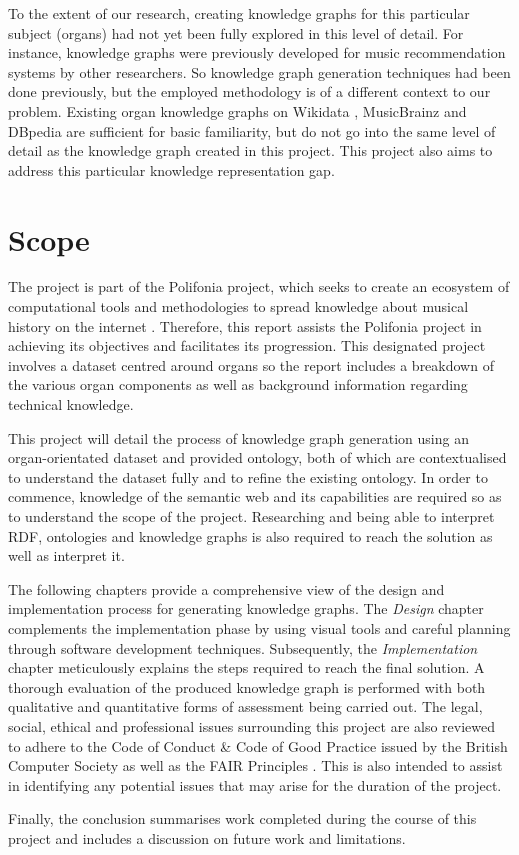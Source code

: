 To the extent of our research, creating knowledge graphs for this particular subject (organs) had not yet been fully explored in this level of detail. For instance, knowledge graphs were previously developed for music recommendation systems \cite{oramas2016sound} by other researchers. So knowledge graph generation techniques had been done previously, but the employed methodology is of a different context to our problem. Existing organ knowledge graphs on Wikidata \cite{organwikidata}, MusicBrainz \cite{organmusicbrainz} and DBpedia \cite{organdbpedia} are sufficient for basic familiarity, but do not go into the same level of detail as the knowledge graph created in this project. This project also aims to address this particular knowledge representation gap. 

\section{Scope}
The project is part of the Polifonia project, which seeks to create an ecosystem of computational tools and methodologies to spread knowledge about musical history on the internet \cite{polifoniaproject}. Therefore, this report assists the Polifonia project in achieving its objectives and facilitates its progression. This designated project involves a dataset centred around organs so the report includes a breakdown of the various organ components as well as background information regarding technical knowledge. 

This project will detail the process of knowledge graph generation using an organ-orientated dataset and provided ontology, both of which are contextualised to understand the dataset fully and to refine the existing ontology. In order to commence, knowledge of the semantic web and its capabilities are required so as to understand the scope of the project. Researching and being able to interpret RDF, ontologies and knowledge graphs is also required to reach the solution as well as interpret it. 

The following chapters provide a comprehensive view of the design and implementation process for generating knowledge graphs. The \textit{Design} chapter complements the implementation phase by using visual tools and careful planning through software development techniques. Subsequently, the \textit{Implementation} chapter meticulously explains the steps required to reach the final solution. A thorough evaluation of the produced knowledge graph is performed with both qualitative and quantitative forms of assessment being carried out. The legal, social, ethical and professional issues surrounding this project are also reviewed to adhere to the Code of Conduct \& Code of Good Practice issued by the British Computer Society \cite{bcs} as well as the FAIR Principles \cite{fairprinciples}. This is also intended to assist in identifying any potential issues that may arise for the duration of the project.

Finally, the conclusion summarises work completed during the course of this project and includes a discussion on future work and limitations. 
